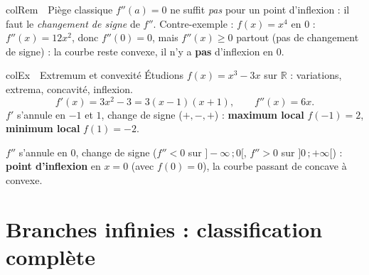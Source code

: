 \documentclass[11pt,a4paper]{article}
\newenvironment{exemple}[1][Exemple]
  {\begin{fiche}{colEx}{\ding{217}~~#1}}{\end{fiche}}
\newenvironment{remarque}[1][Remarque]
  {\begin{fiche}{colRem}{\ding{43}~~#1}}{\end{fiche}}
\begin{document}
\begin{remarque}[Piège classique]
$f''(a) = 0$ ne suffit \emph{pas} pour un point d'inflexion : il faut le \emph{changement de signe} de $f''$. Contre-exemple : $f(x) = x^4$ en $0$ : $f''(x) = 12x^2$, donc $f''(0) = 0$, mais $f''(x) \geq 0$ partout (pas de changement de signe) : la courbe reste convexe, il n'y a \textbf{pas} d'inflexion en $0$.
\end{remarque}

\begin{exemple}[Extremum et convexité]
Étudions $f(x) = x^3 - 3x$ sur $\mathbb{R}$ : variations, extrema, concavité, inflexion.
\[
  f'(x) = 3x^2 - 3 = 3(x-1)(x+1), \qquad f''(x) = 6x.
\]
$f'$ s'annule en $-1$ et $1$, change de signe ($+,-,+$) : \textbf{maximum local} $f(-1) = 2$, \textbf{minimum local} $f(1) = -2$.

\smallskip
$f''$ s'annule en $0$, change de signe ($f'' < 0$ sur $]-\infty\,;0[$, $f'' > 0$ sur $]0\,;+\infty[$) : \textbf{point d'inflexion} en $x = 0$ (avec $f(0) = 0$), la courbe passant de concave à convexe.
\end{exemple}

\section{Branches infinies : classification complète}
\end{document}
